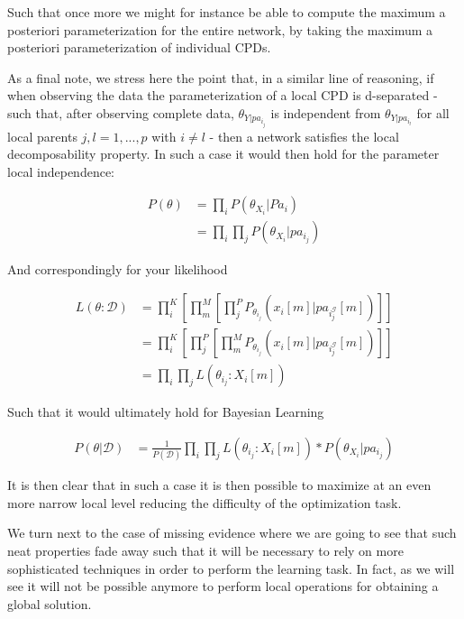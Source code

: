 \documentclass[11pt]{article}
\begin{document}
\begin{article}
Such that once more we might for instance be able to compute the
maximum a posteriori parameterization for the entire network, by
taking the maximum a posteriori parameterization of individual
CPDs.

As a final note, we stress here the point that, in a similar line
of reasoning, if when observing the data the parameterization of a
local CPD is d-separated - such that, after observing complete
data, \(\theta_{Y|pa_i_j}\) is independent from \(\theta_{Y|pa_i_l}\)
for all local parents \(j,l = 1, ..., p\) with \(i \neq l\) - then
a network satisfies the local decomposability property. In such a
case it would then hold for the parameter local independence:

\begin{align}
P(\theta) &= \prod_i P(\theta_{X_i}|Pa_i) \nonumber \\ 
          &= \prod_i \prod_j P(\theta_{X_i}|pa_i_j) \nonumber  
\end{align}

And correspondingly for your likelihood

\begin{align} 
L(\theta : \mathscr{D}) &= \prod_i^K [\prod_m^M [\prod_j^P  P_{\theta_i_j}(x_i[m] | pa_i_j^{\mathscr{G}}[m])]] \nonumber \\
                        &= \prod_i^K [\prod_j^P [\prod_m^M  P_{\theta_i_j}(x_i[m] | pa_i_j^{\mathscr{G}}[m])]] \nonumber \\
                        &= \prod_i \prod_j L(\theta_i_j : X_i[m])  \nonumber
\end{align}

Such that it would ultimately hold for Bayesian Learning

\begin{align} 
P(\theta | \mathscr{D}) &= \frac{1}{P(\mathscr{D})} \prod_i \prod_j L(\theta_i_j : X_i[m]) * P(\theta_{X_i}|pa_i_j) \nonumber
\end{align}

It is then clear that in such a case it is then possible to
maximize at an even more narrow local level reducing the difficulty
of the optimization task.

We turn next to the case of missing evidence where we are going to
see that such neat properties fade away such that it will be
necessary to rely on more sophisticated techniques in order to
perform the learning task. In fact, as we will see it will not be
possible anymore to perform local operations for obtaining a global
solution.


\end{article}
\end{document}
